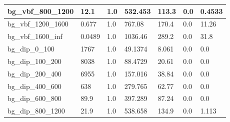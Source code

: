 \documentclass[a4paper, 10pt]{article}
\begin{document}
\begin{table}[H]
\begin{center}
\begin{tabular}{|m{23.0mm}|m{23.0mm}|m{18.0mm}|m{19.0mm}|m{19.0mm}|m{19.0mm}|m{19.0mm}|}
      \hline
      {\cellcolor{white}         bg\_vbf\_800\_1200}& {\cellcolor{white}         12.1}& {\cellcolor{white}         1.0}& {\cellcolor{white}         532.453}& {\cellcolor{white}         113.3}& {\cellcolor{green}         0.0}& {\cellcolor{green}         0.4533}\\
      \hline
      {\cellcolor{white}         bg\_vbf\_1200\_1600}& {\cellcolor{white}         0.677}& {\cellcolor{white}         1.0}& {\cellcolor{white}         767.08}& {\cellcolor{white}         170.4}& {\cellcolor{orange}         0.0}& {\cellcolor{orange}         11.26}\\
      \hline
      {\cellcolor{white}         bg\_vbf\_1600\_inf}& {\cellcolor{white}         0.0489}& {\cellcolor{white}         1.0}& {\cellcolor{white}         1036.46}& {\cellcolor{white}         289.2}& {\cellcolor{red}         0.0}& {\cellcolor{red}         31.8}\\
      \hline
      {\cellcolor{white}         bg\_dip\_0\_100}& {\cellcolor{white}         1767}& {\cellcolor{white}         1.0}& {\cellcolor{white}         49.1374}& {\cellcolor{white}         8.061}& {\cellcolor{green}         0.0}& {\cellcolor{green}         0.0}\\
      \hline
      {\cellcolor{white}         bg\_dip\_100\_200}& {\cellcolor{white}         8038}& {\cellcolor{white}         1.0}& {\cellcolor{white}         88.4729}& {\cellcolor{white}         20.61}& {\cellcolor{green}         0.0}& {\cellcolor{green}         0.0}\\
      \hline
      {\cellcolor{white}         bg\_dip\_200\_400}& {\cellcolor{white}         6955}& {\cellcolor{white}         1.0}& {\cellcolor{white}         157.016}& {\cellcolor{white}         38.84}& {\cellcolor{green}         0.0}& {\cellcolor{green}         0.0}\\
      \hline
      {\cellcolor{white}         bg\_dip\_400\_600}& {\cellcolor{white}         638}& {\cellcolor{white}         1.0}& {\cellcolor{white}         279.765}& {\cellcolor{white}         62.77}& {\cellcolor{green}         0.0}& {\cellcolor{green}         0.0}\\
      \hline
      {\cellcolor{white}         bg\_dip\_600\_800}& {\cellcolor{white}         89.9}& {\cellcolor{white}         1.0}& {\cellcolor{white}         397.289}& {\cellcolor{white}         87.24}& {\cellcolor{green}         0.0}& {\cellcolor{green}         0.0}\\
      \hline
      {\cellcolor{white}         bg\_dip\_800\_1200}& {\cellcolor{white}         21.9}& {\cellcolor{white}         1.0}& {\cellcolor{white}         538.658}& {\cellcolor{white}         134.9}& {\cellcolor{green}         0.0}& {\cellcolor{green}         1.113}\\

\end{tabular}
\end{center}
\end{table}
\end{document}
